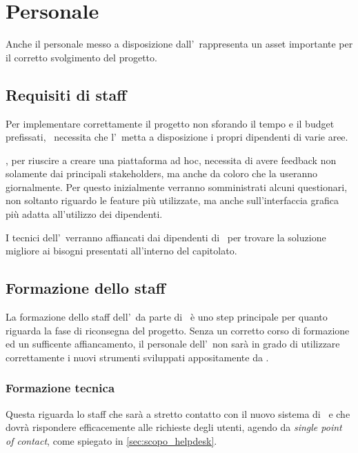 \section{Personale}

	Anche il personale messo a disposizione dall'\istituto~rappresenta un asset importante per il corretto svolgimento del progetto.
	
	\subsection{Requisiti di staff}
	
		Per implementare correttamente il progetto non sforando il tempo e il budget prefissati, \azienda~necessita che l'\istituto~metta a disposizione i propri dipendenti di varie aree.
		
		\azienda, per riuscire a creare una piattaforma ad hoc, necessita di avere feedback non solamente dai principali stakeholders, ma anche da coloro che la useranno giornalmente.
		Per questo inizialmente verranno somministrati alcuni questionari, non soltanto riguardo le feature più utilizzate, ma anche sull'interfaccia grafica più adatta all'utilizzo dei dipendenti.
		
		I tecnici dell'\istituto~verranno affiancati dai dipendenti di \azienda~per trovare la soluzione migliore ai bisogni presentati all'interno del capitolato.
	
	\subsection{Formazione dello staff}
	
		La formazione dello staff dell'\istituto~da parte di \azienda~è uno step principale per quanto riguarda la fase di riconsegna del progetto.
		Senza un corretto corso di formazione ed un sufficente affiancamento, il personale dell'\istituto~non sarà in grado di utilizzare correttamente i nuovi strumenti sviluppati appositamente da \azienda.
	
		\subsubsection{Formazione tecnica}
			
			Questa riguarda lo staff che sarà a stretto contatto con il nuovo sistema di \helpdesk~e che dovrà rispondere efficacemente alle richieste degli utenti, agendo da \textit{single point of contact}, come spiegato in \ref{sec:scopo_helpdesk}.
		
